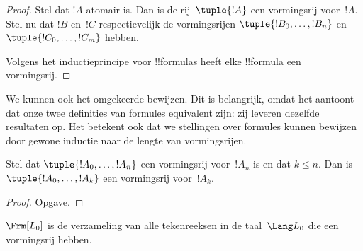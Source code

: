 \documentclass[../../../include/open-logic-section]{subfiles}
\begin{document}
\begin{proof}
Stel dat $!A$ atomair is. Dan is de rij~$\tuple{!A}$ een vormingsrij
voor~$!A$.
%
Stel nu dat $!B$ en~$!C$ respectievelijk de vormingsrijen
$\tuple{!B_0,\dotsc,!B_n}$ en $\tuple{!C_0,\dotsc,!C_m}$ hebben.
%
\begin{enumerate}
\end{enumerate}
Volgens het inductieprincipe voor !!{formula}s heeft elke !!{formula}
een vormingsrij.
\end{proof}

We kunnen ook het omgekeerde bewijzen. Dit is belangrijk, omdat het
aantoont dat onze twee definities van formules equivalent zijn: zij
leveren dezelfde resultaten op. Het betekent ook dat we stellingen
over formules kunnen bewijzen door gewone inductie naar de lengte van
vormingsrijen.

\begin{lem}
Stel dat $\tuple{!A_0,\dotsc,!A_n}$ een vormingsrij voor~$!A_n$ is en
dat $k \leq n$. Dan is $\tuple{!A_0,\dotsc,!A_k}$ een vormingsrij
voor~$!A_k$.
\end{lem}

\begin{proof}
Opgave.
\end{proof}

\begin{thm}
$\Frm[L_0]$ is de verzameling van alle tekenreeksen in de
taal~$\Lang L_0$ die een vormingsrij hebben.
\end{thm}
\end{document}
